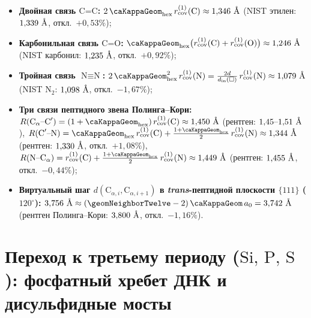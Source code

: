 \begin{itemize}[noitemsep]
\item \textbf{Двойная связь $\text{C=C}$:} $2\,\caKappaGeom_{\mathrm{hex}}\,r_{\mathrm{cov}}^{(1)}(\text{C}) \approx 1{,}346\ \text{\normalfont\AA}$ (NIST этилен: $1{,}339\ \text{\normalfont\AA}$, откл.\ $+0{,}53\%$);
\item \textbf{Карбонильная связь $\text{C=O}$:} $\caKappaGeom_{\mathrm{hex}}\bigl(r_{\mathrm{cov}}^{(1)}(\text{C}) + r_{\mathrm{cov}}^{(1)}(\text{O})\bigr) \approx 1{,}246\ \text{\normalfont\AA}$ (NIST карбонил: $1{,}235\ \text{\normalfont\AA}$, откл.\ $+0{,}92\%$);
\item \textbf{Тройная связь $\text{N}\equiv\text{N}$:} $2\,\caKappaGeom_{\mathrm{hex}}^2\,r_{\mathrm{cov}}^{(1)}(\text{N}) = \frac{2d}{d_{\mathrm{in}}(\square)}\,r_{\mathrm{cov}}^{(1)}(\text{N}) \approx 1{,}079\ \text{\normalfont\AA}$ (NIST $\text{N}_2$: $1{,}098\ \text{\normalfont\AA}$, откл.\ $-1{,}67\%$);
\item \textbf{Три связи пептидного звена Полинга--Кори:}
  $R(\text{C}_\alpha\text{--C}') = (1+\caKappaGeom_{\mathrm{hex}})\,r_{\mathrm{cov}}^{(1)}(\text{C}) \approx 1{,}450\ \text{\normalfont\AA}$ (рентген: $1{,}45\text{--}1{,}51\ \text{\normalfont\AA}$),
  $R(\text{C}'\text{--N}) = \caKappaGeom_{\mathrm{hex}}\,r_{\mathrm{cov}}^{(1)}(\text{C}) + \frac{1+\caKappaGeom_{\mathrm{hex}}}{2}\,r_{\mathrm{cov}}^{(1)}(\text{N}) \approx 1{,}344\ \text{\normalfont\AA}$ (рентген: $1{,}330\ \text{\normalfont\AA}$, откл.\ $+1{,}08\%$),
  $R(\text{N--C}_\alpha) = r_{\mathrm{cov}}^{(1)}(\text{C}) + \frac{1+\caKappaGeom_{\mathrm{hex}}}{2}\,r_{\mathrm{cov}}^{(1)}(\text{N}) \approx 1{,}449\ \text{\normalfont\AA}$ (рентген: $1{,}455\ \text{\normalfont\AA}$, откл.\ $-0{,}44\%$);
\item \textbf{Виртуальный шаг $d(\text{C}_{\alpha,i},\text{C}_{\alpha,i+1})$ в \emph{trans}-пептидной плоскости $\{111\}$ ($120^\circ$):}
  $3{,}756\ \text{\normalfont\AA} \approx (\geomNeighborTwelve-2)\,\caKappaGeom\,a_0 = 3{,}742\ \text{\normalfont\AA}$ (рентген Полинга--Кори: $3{,}800\ \text{\normalfont\AA}$, откл.\ $-1{,}16\%$).
\end{itemize}

\section{Переход к третьему периоду (\texorpdfstring{$\text{Si, P, S}$}{Si, P, S}): фосфатный хребет ДНК и дисульфидные мосты}
\label{sec:chem-period3-radii}


